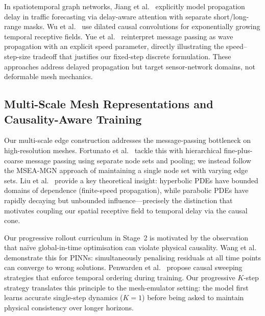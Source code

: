 \documentclass[10pt,twocolumn]{article}
\begin{document}
In spatiotemporal graph networks, Jiang et al.~\cite{jiang2023pdformer} explicitly model propagation delay in traffic forecasting via delay-aware attention with separate short/long-range masks. Wu et al.~\cite{wu2019graphwavenet} use dilated causal convolutions for exponentially growing temporal receptive fields. Yue et al.~\cite{yue2025graphwave} reinterpret message passing as wave propagation with an explicit speed parameter, directly illustrating the speed--step-size tradeoff that justifies our fixed-step discrete formulation. These approaches address delayed propagation but target sensor-network domains, not deformable mesh mechanics.

\subsection{Multi-Scale Mesh Representations and Causality-Aware Training}

Our multi-scale edge construction addresses the message-passing bottleneck on high-resolution meshes. Fortunato et al.~\cite{fortunato2022multiscale} tackle this with hierarchical fine-plus-coarse message passing using separate node sets and pooling; we instead follow the MSEA-MGN approach of maintaining a single node set with varying edge sets. Liu et al.~\cite{liu2024locality_lno} provide a key theoretical insight: hyperbolic PDEs have bounded domains of dependence (finite-speed propagation), while parabolic PDEs have rapidly decaying but unbounded influence---precisely the distinction that motivates coupling our spatial receptive field to temporal delay via the causal cone.

Our progressive rollout curriculum in Stage~2 is motivated by the observation that na\"{i}ve global-in-time optimisation can violate physical causality. Wang et al.~\cite{wang2024respecting} demonstrate this for PINNs: simultaneously penalising residuals at all time points can converge to wrong solutions. Penwarden et al.~\cite{penwarden2023causal_sweep} propose causal sweeping strategies that enforce temporal ordering during training. Our progressive $K$-step strategy translates this principle to the mesh-emulator setting: the model first learns accurate single-step dynamics ($K=1$) before being asked to maintain physical consistency over longer horizons.
\end{document}
